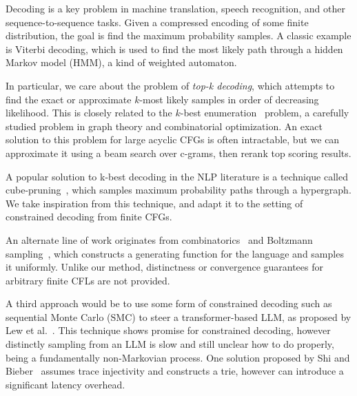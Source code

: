 \documentclass[sigplan,review,acmsmall,nonacm,screen,anonymous]{acmart}\settopmatter{printfolios=false,printccs=false,printacmref=false}
\begin{document}
Decoding is a key problem in machine translation, speech recognition, and other sequence-to-sequence tasks. Given a compressed encoding of some finite distribution, the goal is find the maximum probability samples. A classic example is Viterbi decoding, which is used to find the most likely path through a hidden Markov model (HMM), a kind of weighted automaton.

In particular, we care about the problem of \textit{top-k decoding}, which attempts to find the exact or approximate $k$-most likely samples in order of decreasing likelihood. This is closely related to the $k$-best enumeration~\cite{eppstein2014k} problem, a carefully studied problem in graph theory and combinatorial optimization. An exact solution to this problem for large acyclic CFGs is often intractable, but we can approximate it using a beam search over c-grams, then rerank top scoring results.

A popular solution to k-best decoding in the NLP literature is a technique called cube-pruning~\cite{huang2005better, chiang2007hierarchical}, which samples maximum probability paths through a hypergraph. We take inspiration from this technique, and adapt it to the setting of constrained decoding from finite CFGs.

An alternate line of work originates from combinatorics~\cite{hickey1983uniform, gore1997quasi} and Boltzmann sampling~\cite{duchon2004boltzmann}, which constructs a generating function for the language and samples it uniformly. Unlike our method, distinctness or convergence guarantees for arbitrary finite CFLs are not provided.

A third approach would be to use some form of constrained decoding such as sequential Monte Carlo (SMC) to steer a transformer-based LLM, as proposed by Lew et al.~\cite{lew2023sequential}. This technique shows promise for constrained decoding, however distinctly sampling from an LLM is slow and still unclear how to do properly, being a fundamentally non-Markovian process. One solution proposed by Shi and Bieber~\cite{shi2020incremental} assumes trace injectivity and constructs a trie, however can introduce a significant latency overhead.

\end{document}
